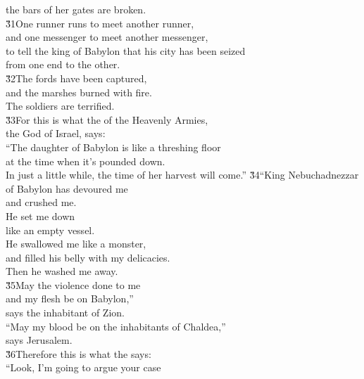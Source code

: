 \begin{poetry}
\poemll    the bars of her gates are broken. \\
\poeml \v{31}One runner runs to meet another runner, \\
\poemll    and one messenger to meet another messenger, \\
\poeml to tell the king of Babylon that his city has been seized \\
\poemll    from one end to the other. \\
\poeml \v{32}The fords have been captured, \\
\poemll    and the marshes burned with fire. \\
\poemlll       The soldiers are terrified. \\
\poeml \v{33}For this is what the  of the Heavenly Armies, \\
\poemll    the God of Israel, says: \\
\poeml ``The daughter of Babylon is like a threshing floor \\
\poemll    at the time when it's pounded down. \\
\poeml In just a little while, the time of her harvest will come.''
\poeml \v{34}``King Nebuchadnezzar of Babylon has devoured me \\
\poemll    and crushed me. \\
\poeml He set me down \\
\poemll    like an empty vessel. \\
\poeml He swallowed me like a monster, \\
\poemll    and filled his belly with my delicacies. \\
\poemlll       Then he washed me away. \\
\poeml \v{35}May the violence done to me \\
\poemll    and my flesh be on Babylon,'' \\
\poemlll       says the inhabitant of Zion. \\
\poeml ``May my blood be on the inhabitants of Chaldea,'' \\
\poemll    says Jerusalem. \\
\poeml \v{36}Therefore this is what the  says: \\
\poeml ``Look, I'm going to argue your case \\

\end{poetry}
